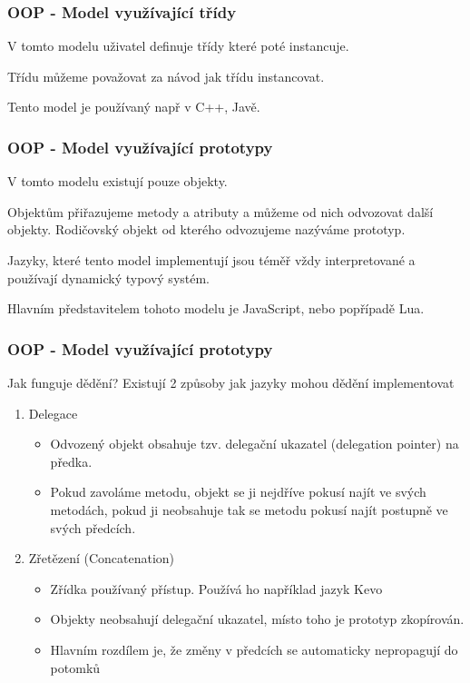 \begin{frame}
    \frametitle{OOP - Model využívající třídy}
    V tomto modelu uživatel definuje třídy které poté instancuje.

    Třídu můžeme považovat za návod jak třídu instancovat.

    Tento model je používaný např v C++, Javě.
\end{frame}

\begin{frame}
    \frametitle{OOP - Model využívající prototypy}
    V tomto modelu existují pouze objekty. %

    Objektům přiřazujeme metody a atributy a můžeme od nich odvozovat další objekty. Rodičovský objekt od kterého odvozujeme nazýváme prototyp.

    Jazyky, které tento model implementují jsou téměř vždy interpretované a používají dynamický typový systém.

    Hlavním představitelem tohoto modelu je JavaScript, nebo popřípadě Lua.



\end{frame}

\begin{frame}
    \frametitle{OOP - Model využívající prototypy}

    Jak funguje dědění?\break
    Existují 2 způsoby jak jazyky mohou dědění implementovat

    \begin{enumerate}
        \item Delegace \begin{itemize}
            \item Odvozený objekt obsahuje tzv. delegační ukazatel (delegation pointer) na předka.
            \item Pokud zavoláme metodu, objekt se ji nejdříve pokusí najít ve svých metodách, pokud ji neobsahuje tak se metodu pokusí najít postupně ve svých předcích.  
        \end{itemize}
        \item Zřetězení (Concatenation) \begin{itemize}
            \item Zřídka používaný přístup. Používá ho například jazyk Kevo
            \item Objekty neobsahují delegační ukazatel, místo toho je prototyp zkopírován.
            \item Hlavním rozdílem je, že změny v předcích se automaticky nepropagují do potomků
        \end{itemize}
    \end{enumerate}

\end{frame}


